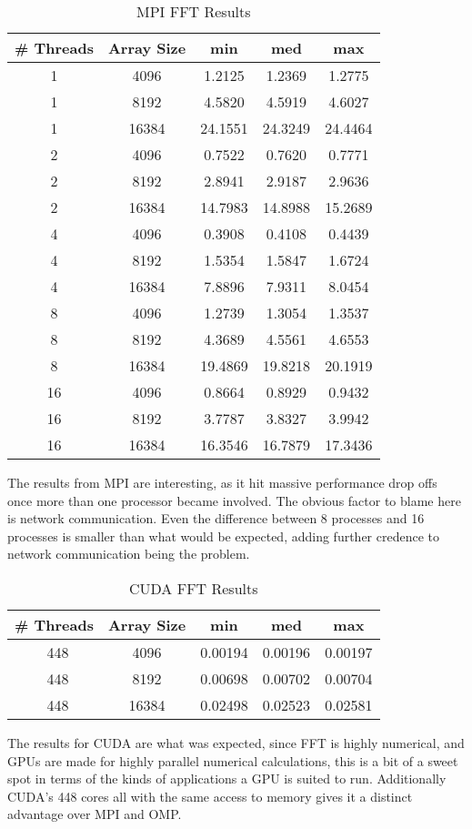 \documentclass[conference,12pt]{IEEEtran}
\begin{document}
	\begin{table}[ht]
	\caption{MPI FFT Results} 
	\centering  
	\begin{tabular}{c c | c c c} 
	\hline\hline                        
	\# Threads & Array Size & min  & med & max\\ [0.5ex] %
	\hline                 
	1 & 4096 & 1.2125 & 1.2369 & 1.2775  \\ 
	1 & 8192 & 4.5820 & 4.5919 & 4.6027  \\
	1 & 16384 & 24.1551  & 24.3249 &24.4464    \\
	\hline
	2 & 4096 & 0.7522& 0.7620 & 0.7771  \\ 
	2 & 8192 &2.8941 &2.9187 & 2.9636  \\
	2 & 16384 & 14.7983 & 14.8988 &15.2689   \\
	\hline
	4 & 4096 & 0.3908& 0.4108 &0.4439  \\ 
	4 & 8192 & 1.5354 &1.5847 & 1.6724  \\
	4 & 16384 & 7.8896  & 7.9311 &8.0454   \\
	\hline
	8 & 4096 &1.2739 & 1.3054 & 1.3537  \\ 
	8 & 8192 & 4.3689 & 4.5561 & 4.6553  \\
	8 & 16384 & 19.4869  & 19.8218 &20.1919   \\
	\hline
	16 & 4096 & 0.8664 & 0.8929 & 0.9432  \\
	16 & 8192 & 3.7787 & 3.8327 & 3.9942  \\
	16 & 16384 & 16.3546  & 16.7879 &17.3436 \\
	\hline 
	\end{tabular}
	\label{table:mpifft} %
	\end{table}
	The results from MPI are interesting, as it hit massive performance drop offs once more than one processor became  involved.  The obvious factor to blame here is network communication.  Even the difference between 8 processes and 16 processes is smaller than what would be expected, adding further credence to network communication being the problem.

	\begin{table}[ht]
	\caption{CUDA FFT Results} 
	\centering  
	\begin{tabular}{c c | c c c} 
	\hline\hline                        
	\# Threads & Array Size & min  & med & max\\ [0.5ex] %
	\hline                 
	~448 & 4096 & 0.00194 & 0.00196 & 0.00197  \\ 
	~448 & 8192 & 0.00698 & 0.00702 & 0.00704  \\
	~448 & 16384 & 0.02498  & 0.02523 &0.02581    \\
	\hline 
	\end{tabular}
	\label{table:cudafft} %
	\end{table}
	The results for CUDA are what was expected, since  FFT is highly numerical, and GPUs are made for highly parallel numerical calculations, this is a bit of a sweet spot in terms of the kinds of applications a GPU is suited to run.  Additionally CUDA's 448 cores all with the same access to memory gives it a distinct advantage over MPI and OMP.
\end{document}
